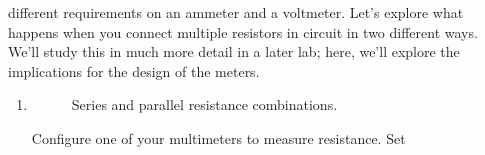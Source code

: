 \documentclass[12pt]{article}
\begin{document}
\begin{enumerate}
  different requirements on an ammeter and a voltmeter.  Let's explore
  what happens when you connect multiple resistors in circuit in two
  different ways.  We'll study this in much more detail in a later
  lab; here, we'll explore the implications for the design of the
  meters. 
  \begin{enumerate}
  \item \label{item:identical}
    \begin{figure}
      \centering
      \qquad
      \caption{Series and parallel resistance combinations.}
      \label{fig:resistances}
    \end{figure}
    Configure one of your multimeters to measure resistance.  Set

\end{enumerate}
\end{enumerate}
\end{document}

